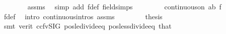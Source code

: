 \begin{isabellebody}
\ \ \ \ \ \ \isamarkupfalse%
\ assms\ \isamarkupfalse%
\ {\isacharparenleft}{\kern0pt}simp\ add{\isacharcolon}{\kern0pt}\ f{\isacharunderscore}{\kern0pt}def\ field{\isacharunderscore}{\kern0pt}simps{\isacharparenright}{\kern0pt}\isanewline
\ \ \isamarkupfalse%
\isanewline
\ \ \ \ \isamarkupfalse%
\ {\isachardoublequoteopen}continuous{\isacharunderscore}{\kern0pt}on\ {\isacharbraceleft}{\kern0pt}a{\isachardot}{\kern0pt}{\isachardot}{\kern0pt}b{\isacharbraceright}{\kern0pt}\ f{\isachardoublequoteclose}\isanewline
\ \ \ \ \ \ \isamarkupfalse%
\ f{\isacharunderscore}{\kern0pt}def\ \isamarkupfalse%
\ {\isacharparenleft}{\kern0pt}intro\ continuous{\isacharunderscore}{\kern0pt}intros\ assms{\isacharparenright}{\kern0pt}\isanewline
\ \ \isamarkupfalse%
\isanewline
\ \ \isamarkupfalse%
\ \isamarkupfalse%
\ {\isacharquery}{\kern0pt}thesis\isanewline
\ \ \ \ \isamarkupfalse%
\ {\isacharparenleft}{\kern0pt}smt\ {\isacharparenleft}{\kern0pt}verit{\isacharcomma}{\kern0pt}\ ccfv{\isacharunderscore}{\kern0pt}SIG{\isacharparenright}{\kern0pt}\ pos{\isacharunderscore}{\kern0pt}le{\isacharunderscore}{\kern0pt}divide{\isacharunderscore}{\kern0pt}eq\ pos{\isacharunderscore}{\kern0pt}less{\isacharunderscore}{\kern0pt}divide{\isacharunderscore}{\kern0pt}eq\ that{\isacharparenright}{\kern0pt}\isanewline
{}\isamarkupfalse%
%
\endisatagproof
{\isafoldproof}%
%
\isadelimproof
\isanewline
%
\endisadelimproof
%
\isadelimtheory
\isanewline
%
\endisadelimtheory
%
\isatagtheory
{}\isamarkupfalse%
%
\endisatagtheory
{\isafoldtheory}%
%
\isadelimtheory
%
\endisadelimtheory
%
\end{isabellebody}%
\endinput
